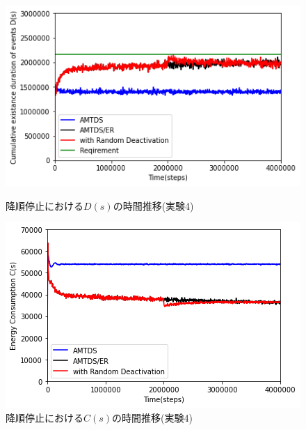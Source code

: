 \documentclass[12pt,a4j,twoside]{jarticle}
\begin{document}
  \begin{figure}
    \centering
    \includegraphics[width=0.9\hsize]{figures/ds_graph_3600_ave_ER_Office_descendingStop.png}
    \caption{降順停止における$D(s)$の時間推移(実験4)}
    \label{fig:ds_DescendingStop}
    \vspace{12pt}
    \centering
    \includegraphics[width=0.9\hsize]{figures/cs_graph_3600_ave_ER_Office_descendingStop.png}
    \caption{降順停止における$C(s)$の時間推移(実験4)}
    \label{fig:cs_DescendingStop}
  \end{figure}
\end{document}
